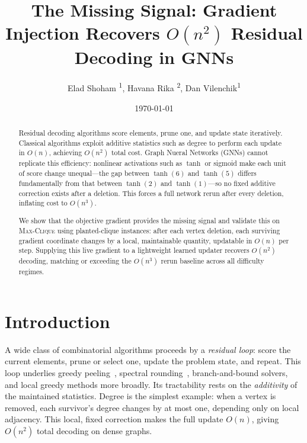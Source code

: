 \documentclass[11pt]{article}
\title{The Missing Signal: Gradient Injection Recovers $O(n^2)$ Residual Decoding in GNNs}
\author {
    Elad Shoham \textsuperscript{\rm 1},
    Havana Rika \textsuperscript{\rm 2},
    Dan Vilenchik\textsuperscript{\rm 1}
}
\date{\today}
\theoremstyle{plain}
\theoremstyle{remark}
\theoremstyle{plain}
\begin{document}
\maketitle

\begin{abstract}
  Residual decoding algorithms score elements, prune one, and update state iteratively.
  Classical algorithms exploit additive statistics such as degree to perform each update
  in $O(n)$, achieving $O(n^2)$ total cost. Graph Nueral Networks (GNNs) cannot replicate this efficiency:
  nonlinear activations such as $\tanh$ or sigmoid make each unit of score change
  unequal---the gap between $\tanh(6)$ and $\tanh(5)$ differs fundamentally from that
  between $\tanh(2)$ and $\tanh(1)$---so no fixed additive correction exists after a
  deletion. This forces a full network rerun after every deletion, inflating cost to
  $O(n^3)$.

  We show that the objective gradient provides the missing signal and validate this on
  \textsc{Max-Clique} using planted-clique instances: after each vertex deletion, each
  surviving gradient coordinate changes by a local, maintainable quantity, updatable in
  $O(n)$ per step. Supplying this live gradient to a lightweight learned updater recovers
  $O(n^2)$ decoding, matching or exceeding the $O(n^3)$ rerun baseline across all
  difficulty regimes.
\end{abstract}

\section{Introduction}

A wide class of combinatorial algorithms proceeds by a \emph{residual loop}: score
the current elements, prune or select one, update the problem state, and repeat.
This loop underlies greedy peeling~\citep{feige2010}, spectral
rounding~\citep{alon1998}, branch-and-bound solvers, and local greedy methods more
broadly. Its tractability
rests on the \emph{additivity} of the maintained statistics. Degree is the
simplest example: when a vertex is removed, each survivor's degree changes by at
most one, depending only on local adjacency. This local, fixed correction makes the
full update $O(n)$, giving $O(n^2)$ total decoding on dense graphs.
\end{document}
